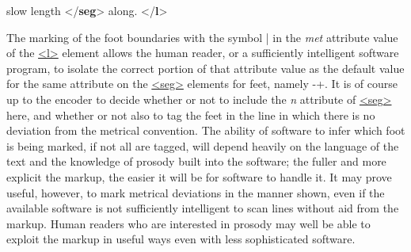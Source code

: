 \begin{shaded}
 slow length {</\textbf{seg}>} along. \mbox{}\newline 
{</\textbf{l}>}\end{shaded}\egroup\par \noindent  The marking of the foot boundaries with the symbol | in the {\itshape met} attribute value of the \hyperref[TEI.l]{<l>} element allows the human reader, or a sufficiently intelligent software program, to isolate the correct portion of that attribute value as the default value for the same attribute on the \hyperref[TEI.seg]{<seg>} elements for feet, namely -+. It is of course up to the encoder to decide whether or not to include the {\itshape n} attribute of \hyperref[TEI.seg]{<seg>} here, and whether or not also to tag the feet in the line in which there is no deviation from the metrical convention. The ability of software to infer which foot is being marked, if not all are tagged, will depend heavily on the language of the text and the knowledge of prosody built into the software; the fuller and more explicit the markup, the easier it will be for software to handle it. It may prove useful, however, to mark metrical deviations in the manner shown, even if the available software is not sufficiently intelligent to scan lines without aid from the markup. Human readers who are interested in prosody may well be able to exploit the markup in useful ways even with less sophisticated software.\par
